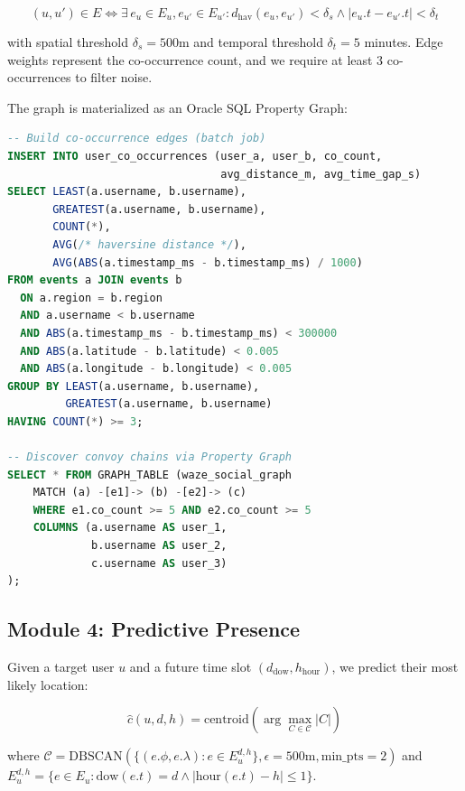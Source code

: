 \documentclass[11pt,a4paper]{article}
\begin{document}
\begin{equation}
\label{eq:cooccurrence}
(u, u') \in E \iff \exists\, e_u \in E_u, e_{u'} \in E_{u'} : d_{\text{hav}}(e_u, e_{u'}) < \delta_s \wedge |e_u.t - e_{u'}.t| < \delta_t
\end{equation}

with spatial threshold $\delta_s = 500$m and temporal threshold $\delta_t = 5$ minutes. Edge weights represent the co-occurrence count, and we require at least 3 co-occurrences to filter noise.

The graph is materialized as an Oracle SQL Property Graph:

\begin{lstlisting}[language=SQL, caption={Co-occurrence graph construction and convoy query.}]
-- Build co-occurrence edges (batch job)
INSERT INTO user_co_occurrences (user_a, user_b, co_count,
                                 avg_distance_m, avg_time_gap_s)
SELECT LEAST(a.username, b.username),
       GREATEST(a.username, b.username),
       COUNT(*),
       AVG(/* haversine distance */),
       AVG(ABS(a.timestamp_ms - b.timestamp_ms) / 1000)
FROM events a JOIN events b
  ON a.region = b.region
  AND a.username < b.username
  AND ABS(a.timestamp_ms - b.timestamp_ms) < 300000
  AND ABS(a.latitude - b.latitude) < 0.005
  AND ABS(a.longitude - b.longitude) < 0.005
GROUP BY LEAST(a.username, b.username),
         GREATEST(a.username, b.username)
HAVING COUNT(*) >= 3;

-- Discover convoy chains via Property Graph
SELECT * FROM GRAPH_TABLE (waze_social_graph
    MATCH (a) -[e1]-> (b) -[e2]-> (c)
    WHERE e1.co_count >= 5 AND e2.co_count >= 5
    COLUMNS (a.username AS user_1,
             b.username AS user_2,
             c.username AS user_3)
);
\end{lstlisting}

\subsection{Module 4: Predictive Presence}
\label{sec:prediction}

Given a target user $u$ and a future time slot $(d_{\text{dow}}, h_{\text{hour}})$, we predict their most likely location:

\begin{equation}
\label{eq:prediction}
\hat{c}(u, d, h) = \text{centroid}\left(\arg\max_{C \in \mathcal{C}} |C|\right)
\end{equation}

where $\mathcal{C} = \text{DBSCAN}(\{(e.\phi, e.\lambda) : e \in E_u^{d,h}\}, \epsilon=500\text{m}, \text{min\_pts}=2)$ and $E_u^{d,h} = \{e \in E_u : \text{dow}(e.t) = d \wedge |\text{hour}(e.t) - h| \leq 1\}$.
\end{document}
